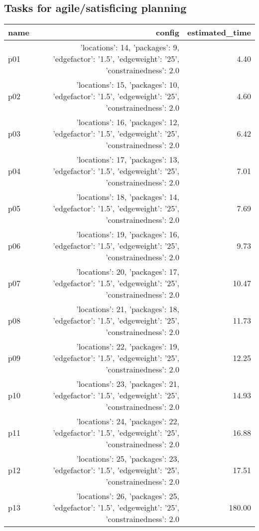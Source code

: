 \documentclass{article}
\begin{document}
                                \subsection*{Tasks for agile/satisficing planning}
                                
                            \begin{center}
                            \scriptsize
                            \begin{tabular}{@{}l|r|r@{}}
                            name & config & estimated\_time\\\midrule
                              p01&{'locations': 14, 'packages': 9, 'edgefactor': '1.5', 'edgeweight': '25', 'constrainedness': 2.0}&4.40\\
  p02&{'locations': 15, 'packages': 10, 'edgefactor': '1.5', 'edgeweight': '25', 'constrainedness': 2.0}&4.60\\
  p03&{'locations': 16, 'packages': 12, 'edgefactor': '1.5', 'edgeweight': '25', 'constrainedness': 2.0}&6.42\\
  p04&{'locations': 17, 'packages': 13, 'edgefactor': '1.5', 'edgeweight': '25', 'constrainedness': 2.0}&7.01\\
  p05&{'locations': 18, 'packages': 14, 'edgefactor': '1.5', 'edgeweight': '25', 'constrainedness': 2.0}&7.69\\
  p06&{'locations': 19, 'packages': 16, 'edgefactor': '1.5', 'edgeweight': '25', 'constrainedness': 2.0}&9.73\\
  p07&{'locations': 20, 'packages': 17, 'edgefactor': '1.5', 'edgeweight': '25', 'constrainedness': 2.0}&10.47\\
  p08&{'locations': 21, 'packages': 18, 'edgefactor': '1.5', 'edgeweight': '25', 'constrainedness': 2.0}&11.73\\
  p09&{'locations': 22, 'packages': 19, 'edgefactor': '1.5', 'edgeweight': '25', 'constrainedness': 2.0}&12.25\\
  p10&{'locations': 23, 'packages': 21, 'edgefactor': '1.5', 'edgeweight': '25', 'constrainedness': 2.0}&14.93\\
  p11&{'locations': 24, 'packages': 22, 'edgefactor': '1.5', 'edgeweight': '25', 'constrainedness': 2.0}&16.88\\
  p12&{'locations': 25, 'packages': 23, 'edgefactor': '1.5', 'edgeweight': '25', 'constrainedness': 2.0}&17.51\\
  p13&{'locations': 26, 'packages': 25, 'edgefactor': '1.5', 'edgeweight': '25', 'constrainedness': 2.0}&180.00\\

\end{tabular}
\end{center}
\end{document}
